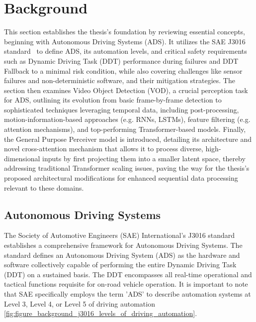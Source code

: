 \section{Background}  \label{Background}

This section establishes the thesis's foundation by reviewing essential concepts, beginning with Autonomous Driving Systems (ADS). It utilizes the SAE J3016 standard~\cite{sae:j3016:2021apr} to define ADS, its automation levels, and critical safety requirements such as Dynamic Driving Task (DDT) performance during failures and DDT Fallback to a minimal risk condition, while also covering challenges like sensor failures and non-deterministic software, and their mitigation strategies. The section then examines Video Object Detection (VOD), a crucial perception task for ADS, outlining its evolution from basic frame-by-frame detection to sophisticated techniques leveraging temporal data, including post-processing, motion-information-based approaches (e.g. RNNs, LSTMs), feature filtering (e.g. attention mechanisms), and top-performing Transformer-based models. Finally, the General Purpose Perceiver model is introduced, detailing its architecture and novel cross-attention mechanism that allows it to process diverse, high-dimensional inputs by first projecting them into a smaller latent space, thereby addressing traditional Transformer scaling issues, paving the way for the thesis's proposed architectural modifications for enhanced sequential data processing relevant to these domains.

\subsection{Autonomous Driving Systems} \label{Background:AutonomousDrivingSystems}


The Society of Automotive Engineers (SAE) International's J3016 standard \cite{sae:j3016:2021apr} establishes a comprehensive framework for Autonomous Driving Systems. The standard defines an Autonomous Driving System (ADS) as the hardware and software collectively capable of performing the entire Dynamic Driving Task (DDT) on a sustained basis. The DDT encompasses all real-time operational and tactical functions requisite for on-road vehicle operation. It is important to note that SAE specifically employs the term 'ADS' to describe automation systems at Level 3, Level 4, or Level 5 of driving automation \ref{fig:figure_background_j3016_levels_of_driving_automation}.

